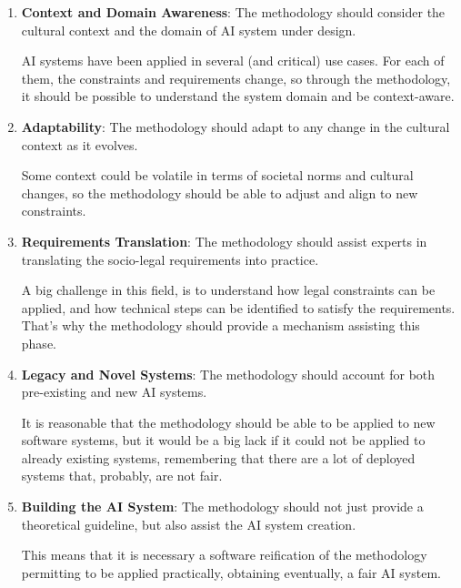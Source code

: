 \documentclass[12pt,a4paper,openright,twoside]{book}
\begin{document}
\begin{enumerate}[label=\textbf{R\arabic*}, ref=R\arabic*]
    \item\label{req:R1} \textbf{Context and Domain Awareness}: The methodology should consider the cultural context and the domain of \ac{AI} system under design.
    
    AI systems have been applied in several (and critical) use cases. For each of them, the constraints and requirements change, so through the methodology, it should be possible to understand the system domain and be context-aware.

    \item\label{req:R2} \textbf{Adaptability}: The methodology should adapt to any change in the cultural context as it evolves.
    
    Some context could be volatile in terms of societal norms and cultural changes, so the methodology should be able to adjust and align to new constraints.
    
    \item\label{req:R3} \textbf{Requirements Translation}: The methodology should assist experts in translating the socio-legal requirements into practice.
    
    A big challenge in this field, is to understand how legal constraints can be applied, and how technical steps can be identified to satisfy the requirements. That's why the methodology should provide a mechanism assisting this phase.
    
    \item\label{req:R4} \textbf{Legacy and Novel Systems}: The methodology should account for both pre-existing and new \ac{AI} systems.
    
    It is reasonable that the methodology should be able to be applied to new software systems, but it would be a big lack if it could not be applied to already existing systems, remembering that there are a lot of deployed systems that, probably, are not fair.

    \item\label{req:R5} \textbf{Building the AI System}: The methodology should not just provide a theoretical guideline, but also assist the AI system creation. 
    
    This means that it is necessary a software reification of the methodology permitting to be applied practically, obtaining eventually, a fair AI system.
\end{enumerate}
\end{document}
